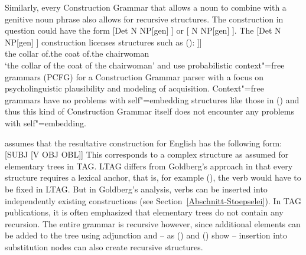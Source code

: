 Similarly, every Construction Grammar that allows a noun to combine with a genitive noun phrase also allows
for recursive structures. The construction in question could have the form [Det N
NP[gen] ] or [ N NP[gen] ]. The [Det N NP[gen] ] construction licenses structures such as ():
\ea
\gll [\sub{NP} des Kragens [\sub{NP} des Mantels [\sub{NP} der Vorsitzenden]]]\\
	{} the collar {} of.the coat {} of.the chairwoman\\
\glt `the collar of the coat of the chairwoman'
\z
\citet{Jurafsky96a} and \citet*{BLT2009a} use probabilistic context"=free grammars (PCFG) for a Construction Grammar parser
with a focus on psycholinguistic plausibility and modeling of acquisition. Context"=free grammars
have no problems with self"=embedding structures like those in () and thus this kind
of Construction Grammar itself does not encounter any problems with self"=embedding.

\citet[]{Goldberg95a} assumes that the resultative construction for English has the following
form:
\ea
{}[SUBJ [V OBJ OBL]] 
\z
This corresponds to a complex structure as assumed for elementary trees in TAG. LTAG differs from Goldberg's approach in that every structure requires a lexical
anchor, that is, for example (), the verb would have to be fixed in LTAG. But in Goldberg's analysis, verbs can be inserted into independently
existing constructions (see Section~\ref{Abschnitt-Stoepselei}). In TAG publications, it is often emphasized that elementary trees do not contain any recursion.
The entire grammar is recursive however, since additional elements can be added to the tree using adjunction and -- as () and
() show -- insertion into substitution nodes can also create recursive structures.





